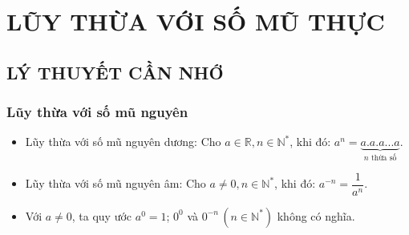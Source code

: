 \setcounter{section}{17}
\section{LŨY THỪA VỚI SỐ MŨ THỰC}
\subsection{LÝ THUYẾT CẦN NHỚ}
\subsubsection{Lũy thừa với số mũ nguyên}
	\begin{itemize}
		\item [\iconCH] Lũy thừa với số mũ nguyên dương: Cho $a\in \mathbb{R}, n\in {\mathbb{N}}^{*}$, khi đó: $a^n=\underbrace{a.a.a...a}_{n \text{ thừa số}}$.
		\item [\iconCH] Lũy thừa với số mũ nguyên âm: Cho $a \ne 0, n\in {\mathbb{N}}^{*}$, khi đó: $a^{-n}=\dfrac{1}{a^n}$.
		\item [\iconCH] Với $a \ne 0$, ta quy ước $a^0=1$; \quad $0^0$ và $0^{-n}\, (n \in \mathbb{N}^{*})$ không có nghĩa.
	\end{itemize}


